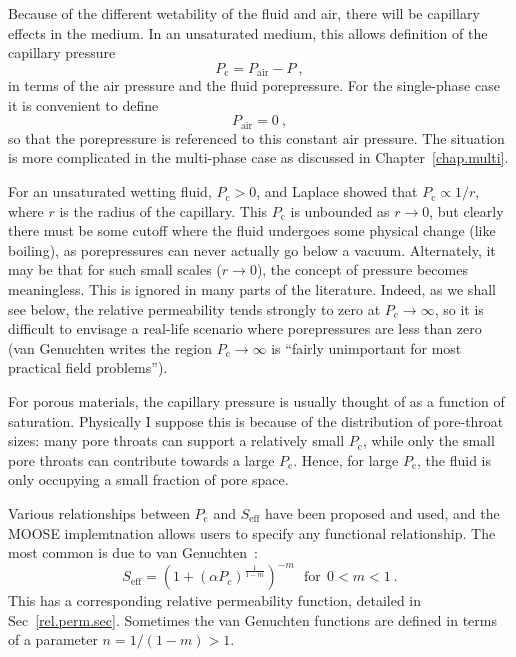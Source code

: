 \documentclass[]{scrreprt}
\begin{document}
Because of the different wetability of the fluid and air, there will
be capillary effects in the medium.  In an unsaturated medium, this
allows definition of the capillary pressure
\begin{equation}
P_{\mathrm{c}} = P_{\mathrm{air}} - P \ ,
\end{equation}
in terms of the air pressure and the fluid porepressure.  For the
single-phase case it is convenient to define
\begin{equation}
P_{\mathrm{air}} = 0 \ ,
\label{eqn.pair.zero}
\end{equation}
so that the porepressure is referenced to this constant air pressure.
The situation is more complicated in the multi-phase case as discussed
in Chapter~\ref{chap.multi}.

For an unsaturated wetting fluid, $P_{\mathrm{c}} > 0$, and
Laplace showed that $P_{\mathrm{c}} \propto 1/r$, where $r$ is the
radius of the capillary.  This $P_{\mathrm{c}}$ is unbounded as
$r\rightarrow 0$, but clearly there must be some cutoff where the
fluid undergoes some physical change (like boiling), as porepressures
can never actually go below a vacuum.  Alternately, it may be that for
such small scales ($r\rightarrow 0$), the concept of pressure becomes
meaningless.  This is ignored in many parts of the literature.
Indeed, as we shall see below, the relative permeability tends
strongly to zero at $P_{\mathrm{c}} \rightarrow \infty$, so it is
difficult to envisage a real-life scenario where porepressures are
less than zero (van Genuchten writes the region
$P_{\mathrm{c}} \rightarrow \infty$ is ``fairly unimportant for most
practical field problems'').

For porous materials, the capillary pressure is usually thought of as
a function of saturation.  Physically I suppose this is because of the
distribution of pore-throat sizes: many pore throats can support a
relatively small $P_{\mathrm{c}}$, while only the small pore throats
can contribute towards a large $P_{\mathrm{c}}$.  Hence, for large
$P_{\mathrm{c}}$, the fluid is only occupying a small fraction of pore
space.

Various relationships between $P_{\mathrm{c}}$ and $S_{\mathrm{eff}}$
have been proposed and used, and the MOOSE implemtnation allows users
to specify any functional relationship.  The most common is due to van
Genuchten~\cite{vangenucthen1980}:
\begin{equation}
S_{\mathrm{eff}} = \left( 1 + (\alpha P_{c})^{\frac{1}{1 - m}}
\right)^{-m} \ \ \ \mbox{for}\ \ 0<m<1 \ .
\label{vg.cap.eqn}
\end{equation}
This has a corresponding relative permeability function, detailed in
Sec~\ref{rel.perm.sec}.  Sometimes the van Genuchten functions are
defined in terms of a parameter $n=1/(1-m)> 1$.
\end{document}
